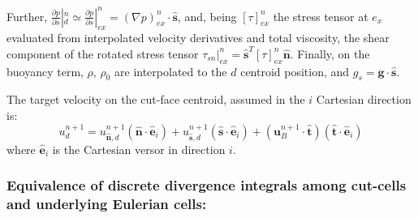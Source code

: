 \documentclass[12pt]{article}
\begin{document}
Further, $\frac{\partial p}{\partial s}  |_d^n \simeq \frac{\partial p}{\partial s} |_{ex}^n = (\nabla p)_{ex}^n \cdot \hat{\mathbf{s}}$,
and, being $[ \tau ]_{ex}^n$ the stress tensor at $e_x$ evaluated from interpolated velocity derivatives and total viscosity, the shear component of the rotated stress tensor $\tau_{sn} |_{ex}^n = \hat{\mathbf{s}}^T [ \tau ]_{ex}^n \hat{\mathbf{n}}$. Finally, on the buoyancy term, $\rho$, $\rho_0$ are interpolated to the $d$ centroid position,  and $g_s = \mathbf{g} \cdot \hat{\mathbf{s}}$.


The target velocity on the cut-face centroid, assumed in the $i$ Cartesian direction is:
%
\begin{equation} 
   u_d^{n+1} = u_{\hat{\mathbf{n}},d}^{n+1} (\hat{\mathbf{n}} \cdot \hat{\mathbf{e}}_i) + u_{\hat{\mathbf{s}},d}^{n+1} (\hat{\mathbf{s}} \cdot \hat{\mathbf{e}}_i) + (\mathbf{u}_{B}^{n+1} \cdot \hat{\mathbf{t}})(\hat{\mathbf{t}} \cdot \hat{\mathbf{e}}_i)
\end{equation}
%
where $\hat{\mathbf{e}}_i$ is the Cartesian versor in direction $i$.

\subsubsection{Equivalence of discrete divergence integrals among cut-cells and underlying Eulerian cells:}
\end{document}
